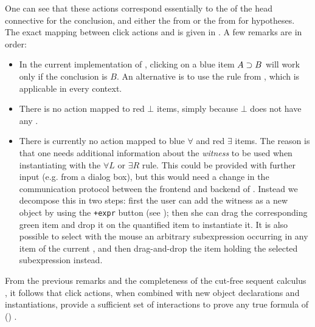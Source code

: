 One can see that these actions correspond essentially to the  of the head connective for the conclusion, and either the
 from  or the  from
 for hypotheses. The exact mapping between click actions and
 is given in . A few remarks are in
order:
\begin{itemize}
  \item In the current implementation of , clicking on a blue item $A
  \supset B$ will work only if the conclusion is $B$. An alternative is to use the
  {} rule from , which is applicable in every
  context.
  \item There is no action mapped to red $\bot$ items, simply because $\bot$
  does not have any .
  \item There is currently no action mapped to blue $∀$ and red $∃$ items. The
  reason is that one needs additional information about the \emph{witness} to be
  used when instantiating with the $∀L$ or $∃R$ rule. This could be provided
  with further input (e.g. from a dialog box), but this would need a change in
  the communication protocol between the frontend and backend of . Instead
  we decompose this in two steps: first the user can add the witness as a new
  object by using the \texttt{+expr} button (see ); then she
  can drag the corresponding green item and drop it on the quantified item to
  instantiate it. It is also possible to select with the mouse an arbitrary
  subexpression occurring in any item of the current , and then
  drag-and-drop the item holding the selected subexpression instead.
\end{itemize}

\begin{remark}\label{rem:click-completeness}
  From the previous remarks and the completeness of the cut-free sequent
  calculus , it follows that click actions, when combined with new
  object declarations and  instantiations, provide a sufficient set of
  interactions to prove any true formula of () .
\end{remark}

